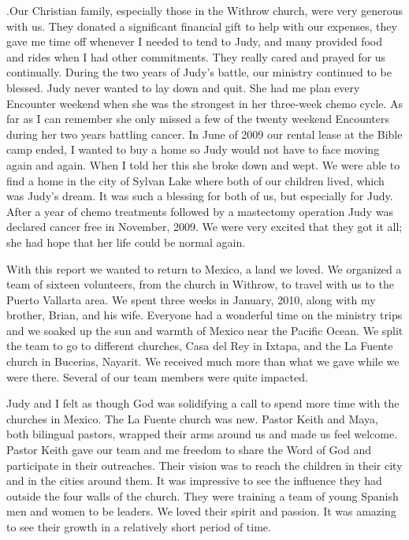 \documentclass[twoside, 12pt]{book}
\begin{document}
.Our Christian family, especially those in the Withrow church, were very generous with us. They donated a significant financial gift to help with our expenses, they gave me time off whenever I needed to tend to Judy, and many provided food and rides when I had other commitments. They really cared and prayed for us continually.
During the two years of Judy’s battle, our ministry continued to be blessed. Judy never wanted to lay down and quit. She had me plan every Encounter weekend when she was the strongest in her three-week chemo cycle. As far as I can remember she only missed a few of the twenty weekend Encounters during her two years battling cancer. 
In June of 2009 our rental lease at the Bible camp ended, I wanted to buy a home so Judy would not have to face moving again and again. When I told her this she broke down and wept.  We were able to find a home in the city of Sylvan Lake where both of our children lived, which was Judy’s dream. It was such a blessing for both of us, but especially for Judy. After a year of chemo treatments followed by a mastectomy operation Judy was declared cancer free in November, 2009. We were very excited that they got it all; she had hope that her life could be normal again.

With this report we wanted to return to Mexico, a land we loved. We organized a team of sixteen volunteers, from the church in Withrow, to travel with us to the Puerto Vallarta area. We spent three weeks in January, 2010, along with my brother, Brian, and his wife. Everyone had a wonderful time on the ministry trips and we soaked up the sun and warmth of Mexico near the Pacific Ocean. We split the team to go to different churches, Casa del Rey in Ixtapa, and the La Fuente church in Bucerias, Nayarit. We received much more than what we gave while we were there. Several of our team members were quite impacted.

Judy and I felt as though God was solidifying a call to spend more time with the churches in Mexico. The La Fuente church was new. Pastor Keith and Maya, both bilingual pastors, wrapped their arms around us and made us feel welcome. Pastor Keith gave our team and me freedom to share the Word of God and participate in their outreaches. Their vision was to reach the children in their city and in the cities around them. It was impressive to see the influence they had outside the four walls of the church. They were training a team of young Spanish men and women to be leaders. We loved their spirit and passion. It was amazing to see their growth in a relatively short period of time. 
\end{document}
